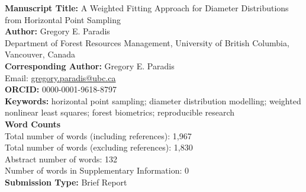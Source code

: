 \documentclass[12pt]{article}
\begin{document}
\thispagestyle{empty}
\begin{flushleft}
\doublespacing
\textbf{Manuscript Title:} A Weighted Fitting Approach for Diameter Distributions from Horizontal Point Sampling\\[1ex]
\textbf{Author:} Gregory E. Paradis\\
Department of Forest Resources Management, University of British Columbia, Vancouver, Canada\\[1ex]
\textbf{Corresponding Author:} Gregory E. Paradis\\
Email: \href{mailto:gregory.paradis@ubc.ca}{gregory.paradis@ubc.ca}\\[1ex]
\textbf{ORCID:} 0000-0001-9618-8797\\[1ex]
\textbf{Keywords:} horizontal point sampling; diameter distribution modelling; weighted nonlinear least squares; forest biometrics; reproducible research\\[1ex]
\textbf{Word Counts}\\
\quad Total number of words (including references): 1,967\\
\quad Total number of words (excluding references): 1,830\\
\quad Abstract number of words: 132\\
\quad Number of words in Supplementary Information: 0\\[1ex]
\textbf{Submission Type:} Brief Report
\end{flushleft}
\end{document}
